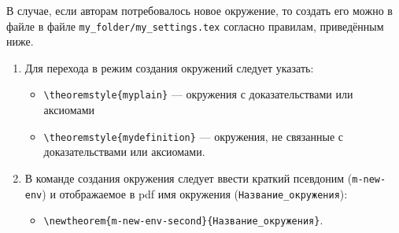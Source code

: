 В случае, если авторам потребовалось новое окружение, то создать его можно в файле в файле \texttt{my\_fol\-der/{}my\_set\-tings.tex} согласно правилам, приведённым ниже.

\begin{enumerate}[1.]
	\item Для перехода в режим создания окружений следует указать:
	\begin{itemize}
		\item \verb|\theoremstyle{myplain}| --- окружения с доказательствами или аксиомами
		\item \verb|\theoremstyle{mydefinition}| --- окружения, не связанные с доказательствами или аксиомами.
	\end{itemize}
	\item В команде создания окружения следует ввести краткий псевдоним (\verb|m-new-env|) и отображаемое в pdf имя окружения (\verb|Название_окружения|):
	\begin{itemize}
		\item \texttt{\textbackslash{}newtheorem\{m-new-env-second\}\{Название\_окруже\-ния\}\-[chap\-ter]}.
	\end{itemize}
\end{enumerate}


%
